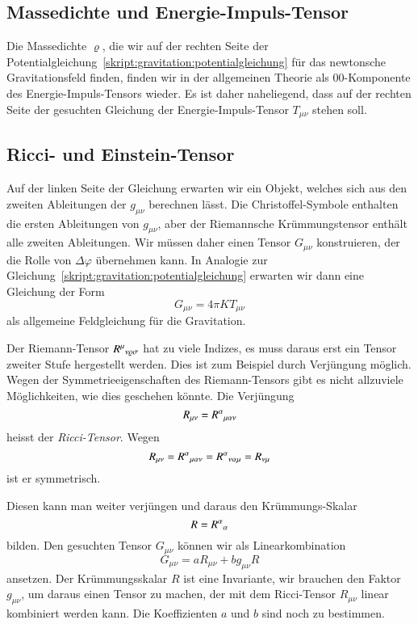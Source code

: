 \subsection{Massedichte und Energie-Impuls-Tensor}
Die Massedichte $\varrho$, die wir auf der rechten Seite der
Potentialgleichung~\eqref{skript:gravitation:potentialgleichung}
für das newtonsche Gravitationsfeld finden,
finden wir in der allgemeinen Theorie als $00$-Komponente
des Energie-Impuls-Tensors wieder.
Es ist daher naheliegend, dass auf der rechten Seite der gesuchten
Gleichung der Energie-Impuls-Tensor $T_{\mu\nu}$ stehen soll.

\subsection{Ricci- und Einstein-Tensor}
Auf der linken Seite der Gleichung erwarten wir ein Objekt, welches
sich aus den zweiten Ableitungen der $g_{\mu\nu}$ berechnen lässt.
Die Christoffel-Symbole enthalten die ersten Ableitungen von $g_{\mu\nu}$,
aber der Riemannsche Krümmungstensor enthält alle zweiten Ableitungen.
Wir müssen daher einen Tensor $G_{\mu\nu}$ konstruieren, der die Rolle
von $\Delta\varphi$ übernehmen kann.
In Analogie zur
Gleichung~\eqref{skript:gravitation:potentialgleichung}
erwarten wir dann eine Gleichung der Form
\[
G_{\mu\nu} = 4\pi KT_{\mu\nu}
\]
als allgemeine Feldgleichung für die Gravitation.

Der Riemann-Tensor $R^\mu\mathstrut_{\nu\varrho\sigma}$ hat zu viele
Indizes, es muss daraus erst ein Tensor zweiter Stufe hergestellt werden.
Dies ist zum Beispiel durch Verjüngung möglich.
Wegen der Symmetrieeigenschaften des Riemann-Tensors gibt es nicht allzuviele
Möglichkeiten, wie dies geschehen könnte.
Die Verjüngung 
\[
R_{\mu\nu} = R^{\alpha}\mathstrut_{\mu\alpha\nu}
\]
heisst der {\em Ricci-Tensor}.
Wegen
\[
R_{\mu\nu}
=
R^{\alpha}\mathstrut_{\mu\alpha\nu}
=
R^{\alpha}\mathstrut_{\nu\alpha\mu}
=
R_{\nu\mu}
\]
ist er symmetrisch.


Diesen kann man weiter verjüngen und daraus den Krümmungs-Skalar
\[
R=R^\alpha\mathstrut_\alpha
\]
bilden.
Den gesuchten Tensor $G_{\mu\nu}$ können wir als Linearkombination
\[
G_{\mu\nu}=a R_{\mu\nu} + bg_{\mu\nu} R
\]
ansetzen.
Der Krümmungsskalar $R$ ist eine Invariante, wir brauchen den Faktor
$g_{\mu\nu}$, um daraus einen Tensor zu machen, der mit dem Ricci-Tensor
$R_{\mu\nu}$ linear kombiniert werden kann.
Die Koeffizienten $a$ und $b$ sind noch zu bestimmen.

